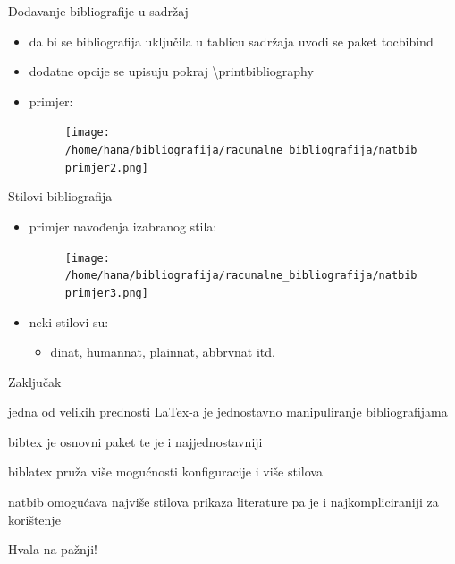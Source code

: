 \documentclass{beamer}
\begin{document}
\begin{frame}{Dodavanje bibliografije u sadržaj}
\begin{itemize}
	\item da bi se bibliografija uključila u tablicu sadržaja uvodi se paket tocbibind \\
	\item dodatne opcije se upisuju pokraj \textbackslash printbibliography \\
	\item primjer:
	\begin{figure}
	\texttt{[image: /home/hana/bibliografija/racunalne\_bibliografija/natbibprimjer2.png]}
	\end{figure}
\end{itemize}
\end{frame}

\begin{frame}{Stilovi bibliografija}
\begin{itemize}
	\item primjer navođenja izabranog stila: \\
	\begin{figure}
	\texttt{[image: /home/hana/bibliografija/racunalne\_bibliografija/natbibprimjer3.png]}
	\end{figure}
	\item neki stilovi su:
	\begin{itemize}
			\item dinat, humannat, plainnat, abbrvnat itd.  \\
	\end{itemize}
\end{itemize}
\end{frame}



\begin{frame}{Zaključak}
	\item jedna od velikih prednosti LaTex-a je jednostavno manipuliranje bibliografijama \\
	\item bibtex je osnovni paket te je i najjednostavniji \\
	\item biblatex pruža više mogućnosti konfiguracije i više stilova \\
	\item natbib omogućava najviše stilova prikaza literature pa je i najkompliciraniji za korištenje \\
\end{frame}

\begin{frame}
Hvala na pažnji!
\end{frame}
\end{document}
